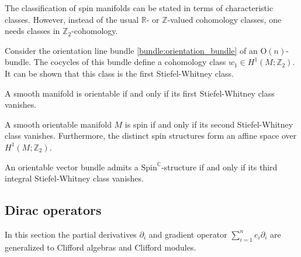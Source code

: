     The classification of spin manifolds can be stated in terms of characteristic classes. However, instead of the usual $\mathbb{R}$- or $\mathbb{Z}$-valued cohomology classes, one needs classes in $\mathbb{Z}_2$-cohomology.
    \begin{property}
        Consider the orientation line bundle \ref{bundle:orientation_bundle} of an $\mathrm{O}(n)$-bundle. The cocycles of this bundle define a cohomology class $w_1\in H^1(M;\mathbb{Z}_2)$. It can be shown that this class is the first Stiefel-Whitney class.
    \end{property}
    \begin{result}[Orientability]
        A smooth manifold is orientable if and only if its first Stiefel-Whitney class vanishes.
    \end{result}
    \begin{property}
        A smooth orientable manifold $M$ is spin if and only if its second Stiefel-Whitney class vanishes. Furthermore, the distinct spin structures form an affine space over $H^1(M;\mathbb{Z}_2)$.
    \end{property}

    \begin{property}
        An orientable vector bundle admits a $\mathrm{Spin}^\mathbb{C}$-structure if and only if its third integral Stiefel-Whitney class vanishes.
    \end{property}

\subsection{Dirac operators}

    In this section the partial derivatives $\partial_i$ and gradient operator $\sum_{i=1}^ne_i\partial_i$ are generalized to Clifford algebras and Clifford modules.


